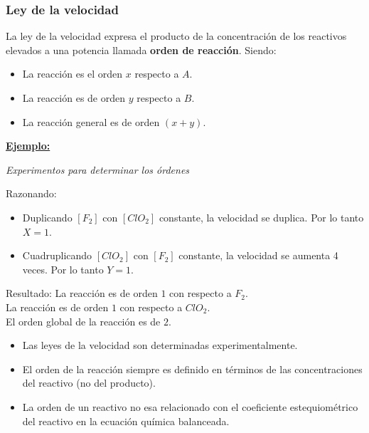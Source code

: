     \subsubsection{Ley de la velocidad}
        \sangria{} La ley de la velocidad expresa el producto de la concentración de los reactivos elevados a una potencia llamada \textbf{orden de reacción}.
        Siendo:
        \begin{itemize}
            \item La reacción es el orden $x$ respecto a $A$.
            \item La reacción es de orden $y$ respecto a $B$.
            \item La reacción general es de orden $(x+y)$.
        \end{itemize}
    \textbf{\underline{Ejemplo:}}    \begin{center} \textit{Experimentos para determinar los órdenes} \end{center} Razonando: \begin{itemize} \item Duplicando $[F_2]$ con $[ClO_2]$ constante, la velocidad se duplica. Por lo tanto $X=1$. \item Cuadruplicando $[ClO_2]$ con $[F_2]$ constante, la velocidad se aumenta 4 veces. Por lo tanto $Y=1$. \end{itemize} Resultado:  La reacción es de orden $1$ con respecto a $F_2$. \\ La reacción es de orden $1$ con respecto a $ClO_2$. \\ El orden global de la reacción es de $2$.
    \saltoPag{}
    \begin{itemize} \item Las leyes de la velocidad son determinadas experimentalmente. \item El orden de la reacción siempre es definido en términos de las concentraciones del reactivo (no del producto). \item La orden de un reactivo no esa relacionado con el coeficiente estequiométrico del reactivo en la ecuación química balanceada. \end{itemize}
